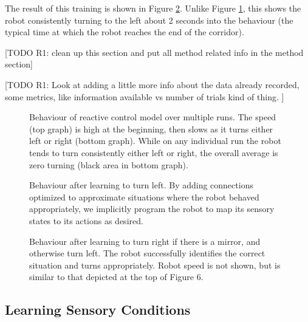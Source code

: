 \documentclass[conference]{IEEEtran}
\begin{document}
The result of this training is shown in Figure \ref{Left}. Unlike Figure \ref{Cnt}, this shows the robot consistently turning to the left
about 2 seconds into the behaviour (the typical time at which
the robot reaches the end of the corridor).

[TODO R1: clean up this section and put all method related info in the method section]

[TODO R1: Look at adding a little more info about the data already recorded, some metrics, like information available vs number of trials kind of thing. ]

\begin{figure}[!t]
\centering
\caption{Behaviour of reactive control model over multiple runs. The speed (top graph) is high at the beginning, then slows as it turns either left or right (bottom graph). While on any individual run the robot tends to turn consistently either left or right, the overall average is zero turning (black
area in bottom graph).}
\label{Cnt}
\end{figure}

\begin{figure}[!t]
\centering
\caption{Behaviour after learning to turn left. By adding connections
optimized to approximate situations where the robot behaved appropriately,
we implicitly program the robot to map its sensory states to its actions as
desired.}
\label{Left}
\end{figure}

\begin{figure}[!t]
\centering
\caption{Behaviour after learning to turn right if there is a mirror, and otherwise turn left. The robot successfully identifies the correct situation and turns appropriately. Robot speed is not shown, but is similar to that depicted at the top of Figure 6.}
\label{Right}
\end{figure}

\subsection{Learning Sensory Conditions}
\end{document}
